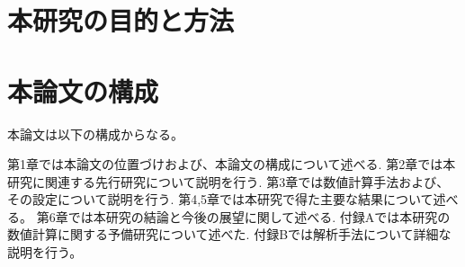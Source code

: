 \documentclass[/Users/ikedahajime/GitHub/reserch/master_report/thesis]{subfiles}
\begin{document}


\section{本研究の目的と方法}

\section{本論文の構成}
本論文は以下の構成からなる。

第1章では本論文の位置づけおよび、本論文の構成について述べる.
第2章では本研究に関連する先行研究について説明を行う.
第3章では数値計算手法および、その設定について説明を行う.
第4,5章では本研究で得た主要な結果について述べる。
第6章では本研究の結論と今後の展望に関して述べる.
付録Aでは本研究の数値計算に関する予備研究について述べた.
付録Bでは解析手法について詳細な説明を行う。
\end{document}
